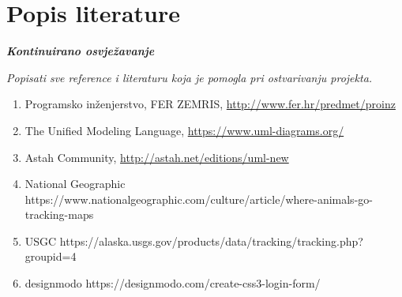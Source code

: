 \chapter*{Popis literature}
	 	
 		\textbf{\textit{Kontinuirano osvježavanje}}
	
		\textit{Popisati sve reference i literaturu koja je pomogla pri ostvarivanju projekta.}
		
		
		\begin{enumerate}
			
			
			\item  Programsko inženjerstvo, FER ZEMRIS, \url{http://www.fer.hr/predmet/proinz}
			
			
			\item  The Unified Modeling Language, \url{https://www.uml-diagrams.org/}
			
			\item  Astah Community, \url{http://astah.net/editions/uml-new}

			
			\item National Geographic https://www.nationalgeographic.com/culture/article/where-animals-go-tracking-maps
			
			\item USGC https://alaska.usgs.gov/products/data/tracking/tracking.php?groupid=4
			
			\item designmodo https://designmodo.com/create-css3-login-form/
		\end{enumerate}
		
		 